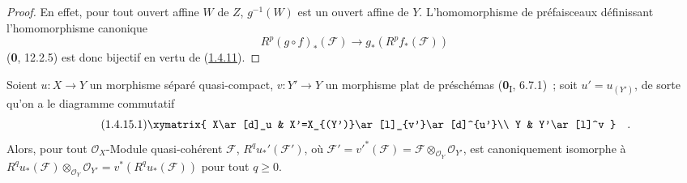 \begin{proof}
En effet, pour tout ouvert affine $W$ de $Z$, $g^{-1}(W)$ est un ouvert
affine de $Y$. L'homomorphisme de préfaisceaux définissant l'homomorphisme
canonique
\[
R^p(g\circ f)_*(\mathcal F)\longrightarrow g_*(R^pf_*(\mathcal F))
\]
(\textbf{0}, 12.2.5) est donc bijectif en vertu de
(\hyperref[III.1.4.11-fr]{1.4.11}).
\end{proof}

\begin{proposition}[1.4.15]
\label{III.1.4.15-fr}
Soient $u:X\to Y$ un morphisme séparé quasi-compact, $v:Y'\to Y$ un
morphisme plat de préschémas \textup{(\textbf{0}\textsubscript{I}, 6.7.1)}~; soit
$u'=u_{(Y')}$, de sorte qu'on a le diagramme commutatif
\begin{equation}
\label{III.1.4.15.1-fr}
\tag{1.4.15.1}
\xymatrix{
X\ar[d]_u & X'=X_{(Y')}\ar[l]_{v'}\ar[d]^{u'}\\
Y & Y'\ar[l]^v
}\quad.
\end{equation}
Alors, pour tout $\mathcal O_X$-Module quasi-cohérent $\mathcal F$,
$R^qu_*'(\mathcal F')$, où
$\mathcal F'=v'^*(\mathcal F)=\mathcal F\otimes_{\mathcal O_Y}\mathcal O_{Y'}$,
est canoniquement isomorphe à
$R^qu_*(\mathcal F)\otimes_{\mathcal O_Y}\mathcal O_{Y'}
=v^*(R^qu_*(\mathcal F))$ pour tout $q\geq0$.
\end{proposition}

